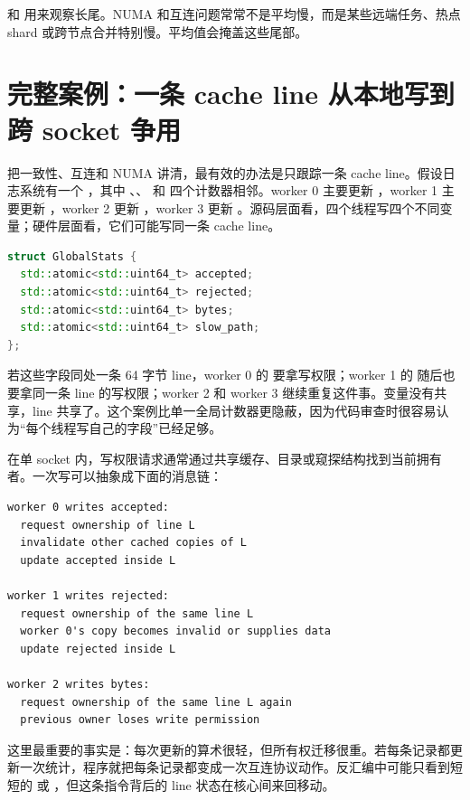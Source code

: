  和  用来观察长尾。NUMA 和互连问题常常不是平均慢，而是某些远端任务、热点 shard 或跨节点合并特别慢。平均值会掩盖这些尾部。

\section{完整案例：一条 cache line 从本地写到跨 socket 争用}

把一致性、互连和 NUMA 讲清，最有效的办法是只跟踪一条 cache line。假设日志系统有一个 ，其中 、、 和  四个计数器相邻。worker 0 主要更新 ，worker 1 主要更新 ，worker 2 更新 ，worker 3 更新 。源码层面看，四个线程写四个不同变量；硬件层面看，它们可能写同一条 cache line。

\begin{lstlisting}[language=C++,caption={软件不同变量可能落在同一条 cache line}]
struct GlobalStats {
  std::atomic<std::uint64_t> accepted;
  std::atomic<std::uint64_t> rejected;
  std::atomic<std::uint64_t> bytes;
  std::atomic<std::uint64_t> slow_path;
};
\end{lstlisting}

若这些字段同处一条 64 字节 line，worker 0 的  要拿写权限；worker 1 的  随后也要拿同一条 line 的写权限；worker 2 和 worker 3 继续重复这件事。变量没有共享，line 共享了。这个案例比单一全局计数器更隐蔽，因为代码审查时很容易认为“每个线程写自己的字段”已经足够。

在单 socket 内，写权限请求通常通过共享缓存、目录或窥探结构找到当前拥有者。一次写可以抽象成下面的消息链：

\begin{lstlisting}[numbers=none,caption={单 socket false sharing 的消息账本}]
worker 0 writes accepted:
  request ownership of line L
  invalidate other cached copies of L
  update accepted inside L

worker 1 writes rejected:
  request ownership of the same line L
  worker 0's copy becomes invalid or supplies data
  update rejected inside L

worker 2 writes bytes:
  request ownership of the same line L again
  previous owner loses write permission
\end{lstlisting}

这里最重要的事实是：每次更新的算术很轻，但所有权迁移很重。若每条记录都更新一次统计，程序就把每条记录都变成一次互连协议动作。反汇编中可能只看到短短的  或 ，但这条指令背后的 line 状态在核心间来回移动。

